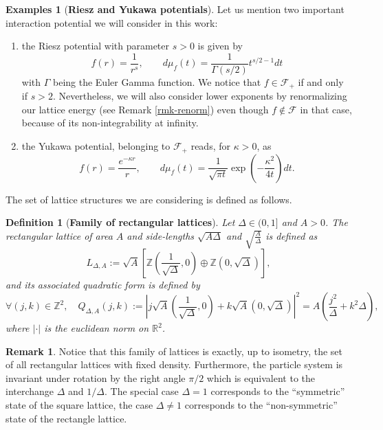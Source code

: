 \documentclass[12pt]{interact}
\newtheorem{defi}[thm]{Definition}
\theoremstyle{definition}
\newtheorem{remark}[thm]{Remark}
\newtheorem{examples}[thm]{Examples}
\newcommand{\R}{\mathbb R}
\newcommand{\Z}{\mathbb Z}
\begin{document}
\begin{examples}[\textbf{Riesz and Yukawa potentials}]
Let us mention two important interaction potential we will consider
in this work:
\begin{enumerate}
\item the Riesz potential with parameter $s>0$ is given by
\begin{equation}\label{riesz}
f(r) = \frac{1}{r^s} , \qquad
d\mu_f(t) =  \frac{1}{\Gamma(s/2)} t^{s/2-1}dt
\end{equation}
with $\Gamma$ being the Euler Gamma function.
We notice that $f\in \mathcal{F}_+$ if and only if $s>2$.
Nevertheless, we will also consider lower exponents by renormalizing
our lattice energy (see Remark \ref{rmk-renorm}) even though
$f\not\in \mathcal{F}$ in that case, because of its non-integrability
at infinity.
\item the Yukawa potential, belonging to $\mathcal{F}_+$ reads,
for $\kappa>0$, as
\begin{equation}\label{yukawa}
f(r) = \frac{e^{-\kappa r}}{r} , \qquad
d\mu_f(t) =  \frac{1}{\sqrt{\pi t}}
\exp\left(-\frac{\kappa^2}{4t} \right)dt .
\end{equation}
\end{enumerate}
\end{examples}

The set of lattice structures we are considering is defined as follows.

\begin{defi}[\textbf{Family of rectangular lattices}]
Let $\Delta \in (0,1]$ and $A>0$. The rectangular lattice of area $A$ and side-lengths $\sqrt{A\Delta}$ and $\sqrt{\frac{A}{\Delta}}$ is defined as
$$
L_{\Delta, A}:=\sqrt{A}\left[\Z\left(\frac{1}{\sqrt{\Delta}},0 \right)\oplus \Z \left(0,\sqrt{ \Delta} \right)\right],
$$
and its associated quadratic form is defined by
$$
\forall (j,k)\in \Z^2,\quad Q_{\Delta, A}(j,k):=\left|j\sqrt{A}\left(\frac{1}{\sqrt{\Delta}},0 \right)+k\sqrt{A}\left(0,\sqrt{ \Delta} \right) \right|^2= A \left( \frac{j^2}{\Delta} + k^2\Delta \right),
$$
where $|\cdot|$ is the euclidean norm on $\R^2$.
\end{defi}
\begin{remark}
Notice that this family of lattices is exactly, up to isometry, the set of all rectangular lattices with fixed density. Furthermore, the particle system is invariant under rotation by the right angle $\pi/2$
which is equivalent to the interchange
$\Delta$ and $1/\Delta$.
The special case $\Delta=1$ corresponds to the ``symmetric'' state of
the square lattice, the case $\Delta\ne 1$ corresponds to
the ``non-symmetric'' state of the rectangle lattice.
\end{remark}
\end{document}
